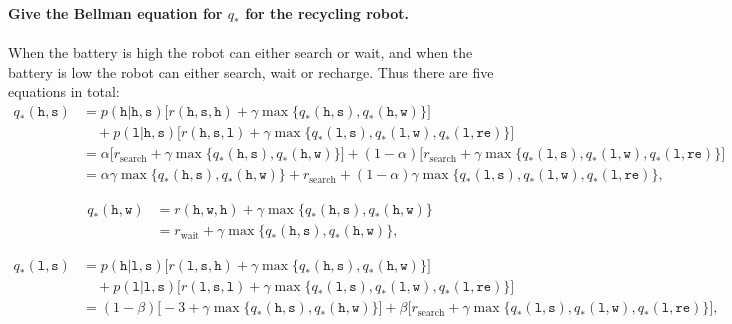 \documentclass[a4paper,11pt]{article}
\numberwithin{equation}{section}
\theoremstyle{remark}
\begin{document}
\textbf{Give the Bellman equation for $q_*$ for the recycling robot.}
\\ \\
When the battery is high the robot can either search or wait, and when the battery is low the robot can either search, wait or recharge. Thus there are five equations in total:
\begin{align*}
	q_*(\texttt{h}, \texttt{s}) & = p(\texttt{h} | \texttt{h}, \texttt{s}) \big[r(\texttt{h}, \texttt{s}, \texttt{h}) + 
	\gamma \max\{ q_*(\texttt{h}, \texttt{s}), q_*(\texttt{h}, \texttt{w}) \} \big] \\
	& \quad + p(\texttt{l} | \texttt{h}, \texttt{s}) \big[r(\texttt{h}, \texttt{s}, \texttt{l}) + 
	\gamma \max\{ q_*(\texttt{l}, \texttt{s}), q_*(\texttt{l}, \texttt{w}), q_*(\texttt{l}, \texttt{re}) \} \big] \\
	& = \alpha \big[ r_{\text{search}} + \gamma \max \{ q_*(\texttt{h}, \texttt{s}), q_*(\texttt{h}, \texttt{w}) \} \big] +
	(1 - \alpha) \big[ r_{\text{search}} + \gamma \max\{ q_*(\texttt{l}, \texttt{s}), q_*(\texttt{l}, \texttt{w}), q_*(\texttt{l}, \texttt{re}) \} \big] \\
	& = \alpha \gamma \max \{ q_*(\texttt{h}, \texttt{s}), q_*(\texttt{h}, \texttt{w}) \} + r_{\text{search}} +
	(1 - \alpha) \gamma \max\{ q_*(\texttt{l}, \texttt{s}), q_*(\texttt{l}, \texttt{w}), q_*(\texttt{l}, \texttt{re}) \},
\end{align*}

\begin{align*}
	q_*(\texttt{h}, \texttt{w}) & = r(\texttt{h}, \texttt{w}, \texttt{h}) + 
	\gamma \max\{ q_*(\texttt{h}, \texttt{s}), q_*(\texttt{h}, \texttt{w}) \}  \\
	& = r_{\text{wait}} + \gamma \max \{ q_*(\texttt{h}, \texttt{s}), q_*(\texttt{h}, \texttt{w}) \},
\end{align*}

\begin{align*}
	q_*(\texttt{l}, \texttt{s}) & = p(\texttt{h} | \texttt{l}, \texttt{s}) \big[r(\texttt{l}, \texttt{s}, \texttt{h}) + 
	\gamma \max\{ q_*(\texttt{h}, \texttt{s}), q_*(\texttt{h}, \texttt{w}) \} \big] \\
	& \quad + p(\texttt{l} | \texttt{l}, \texttt{s}) \big[r(\texttt{l}, \texttt{s}, \texttt{l}) + 
	\gamma \max\{ q_*(\texttt{l}, \texttt{s}), q_*(\texttt{l}, \texttt{w}), q_*(\texttt{l}, \texttt{re}) \} \big] \\
	& = (1 - \beta) \big[ -3 + \gamma \max \{ q_*(\texttt{h}, \texttt{s}), q_*(\texttt{h}, \texttt{w}) \} \big] +
	\beta \big[ r_{\text{search}} 
	+ \gamma \max\{ q_*(\texttt{l}, \texttt{s}), q_*(\texttt{l}, \texttt{w}), q_*(\texttt{l}, \texttt{re}) \} \big],
\end{align*}
\end{document}
